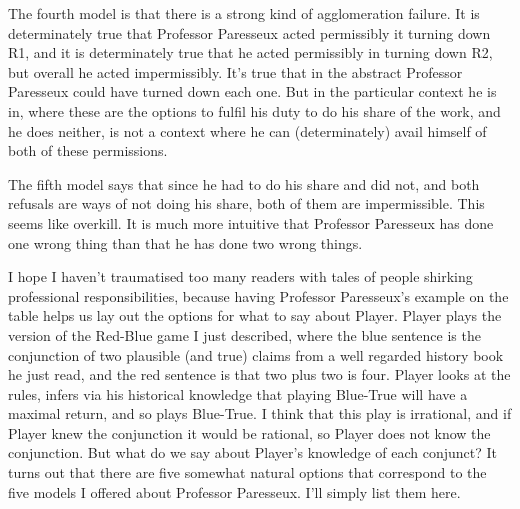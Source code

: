 \documentclass[
  11pt,
]{book}
\begin{document}
The fourth model is that there is a strong kind of agglomeration failure. It is determinately true that Professor Paresseux acted permissibly it turning down R1, and it is determinately true that he acted permissibly in turning down R2, but overall he acted impermissibly. It's true that in the abstract Professor Paresseux could have turned down each one. But in the particular context he is in, where these are the options to fulfil his duty to do his share of the work, and he does neither, is not a context where he can (determinately) avail himself of both of these permissions.

The fifth model says that since he had to do his share and did not, and both refusals are ways of not doing his share, both of them are impermissible. This seems like overkill. It is much more intuitive that Professor Paresseux has done one wrong thing than that he has done two wrong things.

I hope I haven't traumatised too many readers with tales of people shirking professional responsibilities, because having Professor Paresseux's example on the table helps us lay out the options for what to say about Player. Player plays the version of the Red-Blue game I just described, where the blue sentence is the conjunction of two plausible (and true) claims from a well regarded history book he just read, and the red sentence is that two plus two is four. Player looks at the rules, infers via his historical knowledge that playing Blue-True will have a maximal return, and so plays Blue-True. I think that this play is irrational, and if Player knew the conjunction it would be rational, so Player does not know the conjunction. But what do we say about Player's knowledge of each conjunct? It turns out that there are five somewhat natural options that correspond to the five models I offered about Professor Paresseux. I'll simply list them here.
\end{document}
